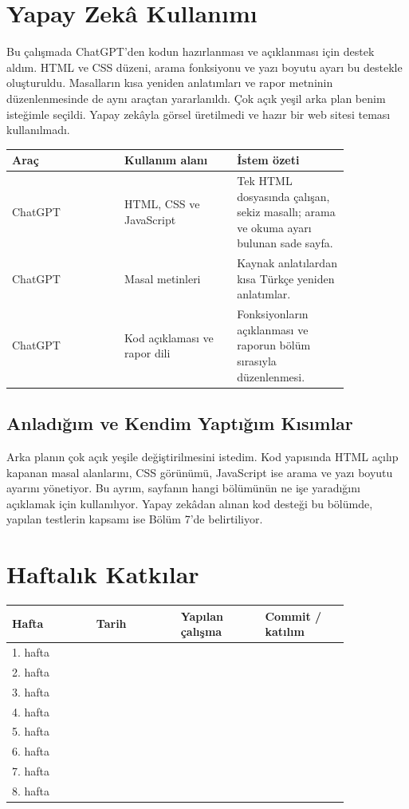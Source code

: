 \documentclass[11pt,a4paper]{article}
\begin{document}
\newpage
\section{Yapay Zekâ Kullanımı}
Bu çalışmada ChatGPT’den kodun hazırlanması ve açıklanması için destek aldım. HTML ve CSS düzeni, arama fonksiyonu ve yazı boyutu ayarı bu destekle oluşturuldu. Masalların kısa yeniden anlatımları ve rapor metninin düzenlenmesinde de aynı araçtan yararlanıldı. Çok açık yeşil arka plan benim isteğimle seçildi. Yapay zekâyla görsel üretilmedi ve hazır bir web sitesi teması kullanılmadı.

\begin{longtable}{|p{0.28\linewidth}|p{0.28\linewidth}|p{0.28\linewidth}|}
\hline \textbf{Araç} & \textbf{Kullanım alanı} & \textbf{İstem özeti} \\ \hline\endhead
ChatGPT & HTML, CSS ve JavaScript & Tek HTML dosyasında çalışan, sekiz masallı; arama ve okuma ayarı bulunan sade sayfa. \\ \hline
ChatGPT & Masal metinleri & Kaynak anlatılardan kısa Türkçe yeniden anlatımlar. \\ \hline
ChatGPT & Kod açıklaması ve rapor dili & Fonksiyonların açıklanması ve raporun bölüm sırasıyla düzenlenmesi. \\ \hline
\end{longtable}
\subsection{Anladığım ve Kendim Yaptığım Kısımlar}
Arka planın çok açık yeşile değiştirilmesini istedim. Kod yapısında HTML açılıp kapanan masal alanlarını, CSS görünümü, JavaScript ise arama ve yazı boyutu ayarını yönetiyor. Bu ayrım, sayfanın hangi bölümünün ne işe yaradığını açıklamak için kullanılıyor. Yapay zekâdan alınan kod desteği bu bölümde, yapılan testlerin kapsamı ise Bölüm 7’de belirtiliyor.

\section{Haftalık Katkılar}
\begin{longtable}{|p{0.21\linewidth}|p{0.21\linewidth}|p{0.21\linewidth}|p{0.21\linewidth}|}
\hline \textbf{Hafta} & \textbf{Tarih} & \textbf{Yapılan çalışma} & \textbf{Commit / katılım} \\ \hline\endhead
1. hafta &  &  &  \\ \hline
2. hafta &  &  &  \\ \hline
3. hafta &  &  &  \\ \hline
4. hafta &  &  &  \\ \hline
5. hafta &  &  &  \\ \hline
6. hafta &  &  &  \\ \hline
7. hafta &  &  &  \\ \hline
8. hafta &  &  &  \\ \hline
\end{longtable}
\newpage
\end{document}
